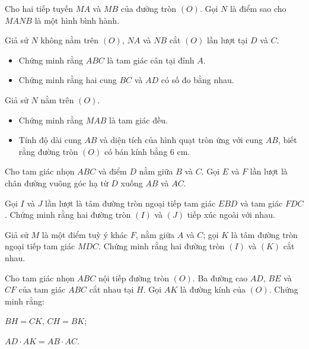 \begin{practice}
\begin{questions}[resume=SBT]
        \item Cho hai tiếp tuyến $MA$ và $MB$ của đường tròn $(O)$. Gọi $N$ là điểm sao cho $MANB$ là một hình bình hành.
        \begin{questions}
            \item Giả sử $N$ không nằm trên $(O)$, $NA$ và $NB$ cắt $(O)$ lần lượt tại $D$ và $C$.
            \begin{itemize}[label=--]
                \item Chứng minh rằng $ABC$ là tam giác cân tại đỉnh $A$.
                \item Chứng minh rằng hai cung $BC$ và $AD$ có số đo bằng nhau.
            \end{itemize}
            \answerline
            \answerline
            \item Giả sử $N$ nằm trên $(O)$.
            \begin{itemize}[label=--]
                \item Chứng minh rằng $MAB$ là tam giác đều.
                \item Tính độ dài cung $AB$ và diện tích của hình quạt tròn ứng với cung $AB$, biết rằng đường tròn $(O)$ có bán kính bằng $6$ cm.
            \end{itemize}
            \answerline
            \answerline
        \end{questions}

        \item Cho tam giác nhọn $ABC$ và điểm $D$ nằm giữa $B$ và $C$. Gọi $E$ và $F$ lần lượt là chân đường vuông góc hạ từ $D$ xuống $AB$ và $AC$.
        \begin{questions}
            \item Gọi $I$ và $J$ lần lượt là tâm đường tròn ngoại tiếp tam giác $EBD$ và tam giác $FDC$. Chứng minh rằng hai đường tròn $(I)$ và $(J)$ tiếp xúc ngoài với nhau.
            \answerline
            \answerline
            \item Giả sử $M$ là một điểm tuỳ ý khác $F$, nằm giữa $A$ và $C$; gọi $K$ là tâm đường tròn ngoại tiếp tam giác $MDC$. Chứng minh rằng hai đường tròn $(I)$ và $(K)$ cắt nhau.
            \answerline
            \answerline
        \end{questions}

        \item Cho tam giác nhọn $ABC$ nội tiếp đường tròn $(O)$. Ba đường cao $AD$, $BE$ và $CF$ của tam giác $ABC$ cắt nhau tại $H$. Gọi $AK$ là đường kính của $(O)$. Chứng minh rằng:
        \begin{questions}
            \item $BH=CK$, $CH=BK$;
            \answerline
            \answerline
            \item $AD\cdot AK=AB\cdot AC$.
            \answerline
            \answerline
        \end{questions}


\end{questions}
\end{practice}
